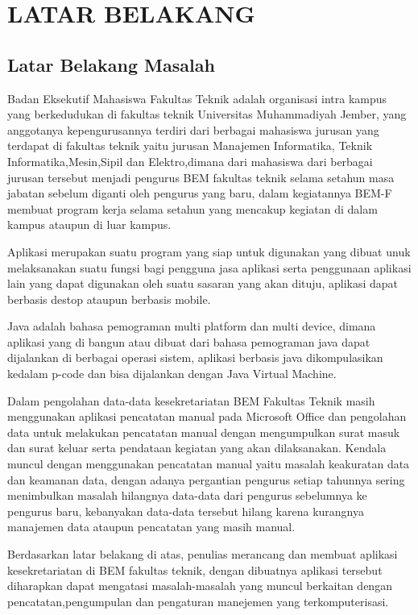 \documentclass{jtetiproposalskripsi}
\begin{document}
\chapter{LATAR BELAKANG}

\section{Latar Belakang Masalah}
Badan Eksekutif Mahasiswa Fakultas Teknik adalah organisasi intra kampus yang berkedudukan di fakultas teknik Universitas Muhammadiyah Jember, yang anggotanya kepengurusannya terdiri dari berbagai mahasiswa jurusan yang terdapat di fakultas teknik yaitu jurusan Manajemen Informatika, Teknik Informatika,Mesin,Sipil dan Elektro,dimana dari mahasiswa dari berbagai jurusan tersebut menjadi pengurus BEM fakultas teknik selama setahun masa jabatan sebelum diganti oleh pengurus yang baru, dalam kegiatannya BEM-F membuat program kerja selama setahun yang mencakup kegiatan di dalam kampus ataupun di luar kampus.

Aplikasi  merupakan suatu program yang siap untuk digunakan yang dibuat unuk melaksanakan suatu fungsi bagi pengguna jasa aplikasi serta penggunaan aplikasi lain yang dapat digunakan oleh suatu sasaran yang akan dituju, aplikasi dapat berbasis destop ataupun berbasis mobile.

Java adalah bahasa pemograman multi platform dan multi device, dimana aplikasi yang di bangun atau dibuat dari bahasa pemograman java dapat dijalankan di berbagai operasi sistem, aplikasi berbasis java dikompulasikan kedalam p-code dan bisa dijalankan dengan Java Virtual Machine.

Dalam pengolahan data-data kesekretariatan BEM Fakultas Teknik masih menggunakan aplikasi pencatatan manual pada Microsoft Office dan pengolahan data untuk melakukan pencatatan manual dengan mengumpulkan surat masuk dan surat keluar serta pendataan kegiatan yang akan dilaksanakan.  Kendala muncul dengan menggunakan pencatatan manual yaitu masalah keakuratan data dan keamanan data, dengan adanya pergantian pengurus setiap tahunnya sering menimbulkan masalah hilangnya data-data dari pengurus sebelumnya ke pengurus baru, kebanyakan data-data tersebut hilang karena kurangnya manajemen data ataupun pencatatan yang masih manual.

Berdasarkan latar belakang di atas, penulias merancang dan membuat aplikasi kesekretariatan di BEM fakultas teknik, dengan dibuatnya aplikasi tersebut diharapkan dapat mengatasi masalah-masalah yang muncul berkaitan dengan pencatatan,pengumpulan dan pengaturan manejemen yang terkomputerisasi.
\end{document}
